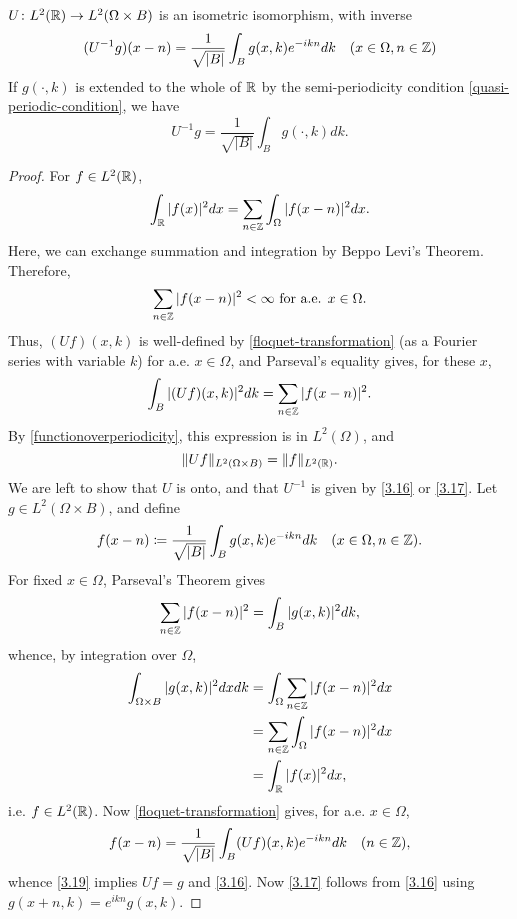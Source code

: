 \begin{theorem} \label{3.4.1}
	$ U \colon L^{2}(\mathbb{R}) \rightarrow L^{2}(\Omega \times B)$ is an isometric isomorphism, with inverse
		\begin{equation}
			(U^{-1}g)(x - n) = \frac{1}{\sqrt{|B|}} \int_{B} g(x, k) e^{-ikn} dk \quad (x \in \Omega, n \in \mathbb{Z}) \label{3.16}
		\end{equation} 
	If $g(\cdot, k)$ is extended to the whole of $\mathbb{R}$ by the semi-periodicity condition \eqref{quasi-periodic-condition}, we have
		\begin{equation}
			U^{-1} g = \frac{1}{\sqrt{|B|}} \int_{B} g(\cdot, k) dk. \label{3.17}
		\end{equation}
\end{theorem}
\begin{proof}
	For $f \in L^{2}(\mathbb{R})$,
		\begin{equation}
			\int_{\mathbb{R}} |f(x)|^{2} dx = \sum_{n \in \mathbb{Z}} \int_{\Omega} |f(x - n)|^{2} dx. \label{functionoverperiodicity}
		\end{equation} 
	Here, we can exchange summation and integration by Beppo Levi's Theorem. Therefore, 
		\[ \sum_{n \in \mathbb{Z}} |f(x - n)|^{2} < \infty \text{ for a.e. } x \in \Omega.\]
	Thus, $(Uf)(x, k)$ is well-defined by \eqref{floquet-transformation} (as a Fourier series with variable $k$) for a.e. $x \in \Omega$, and Parseval's equality gives, for these $x$,
		\[ \int_{B}|(Uf)(x,k)|^{2} dk = \sum_{n \in \mathbb{Z}} |f(x - n)|^{2}. \]
	By \eqref{functionoverperiodicity}, this expression is in $L^{2}(\Omega)$, and
		\[ \| Uf \|_{L^{2}(\Omega \times B)} = \|f\|_{L^{2}(\mathbb{R})}. \]
	We are left to show that $U$ is onto, and that $U^{-1}$ is given by \eqref{3.16} or \eqref{3.17}. Let $g \in L^{2}(\Omega \times B)$, and define
		\begin{equation}
			f(x - n) \coloneqq \frac{1}{\sqrt{|B|}} \int_{B} g(x, k) e^{-ikn} dk \quad (x \in \Omega, n \in\mathbb{Z}).\label{3.19}
		\end{equation}
	For fixed $x \in \Omega$, Parseval's Theorem gives
		\[ \sum_{n \in \mathbb{Z}} |f(x - n)|^{2} = \int_{B} |g(x, k)|^{2} dk, \]
	whence, by integration over $\Omega$,
		\begin{eqnarray}
			\int_{\Omega \times B} |g(x, k)|^{2} dx dk & = \int_{\Omega} \sum_{n \in \mathbb{Z}} |f(x - n)|^{2} dx \\
				& = \sum_{n \in\mathbb{Z}} \int_{\Omega} |f(x-n)|^{2} dx \\
				& = \int_{\mathbb{R}} |f(x)|^{2} dx,	
		\end{eqnarray}
	i.e. $f \in L^{2}(\mathbb{R})$. Now \eqref{floquet-transformation} gives, for a.e. $x \in\Omega$,
		\[ f(x - n) = \frac{1}{\sqrt{|B|}} \int_{B} (Uf)(x,k) e^{-ikn} dk \quad (n \in \mathbb{Z}), \]
	whence \eqref{3.19} implies $U f = g$ and \eqref{3.16}. Now \eqref{3.17} follows from \eqref{3.16} using $g(x + n, k) = e^{ikn} g(x, k)$.
\end{proof}